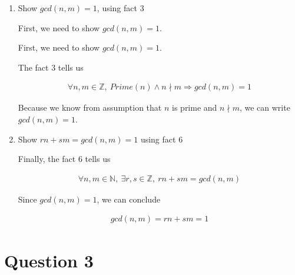 \documentclass[12pt]{article}
\begin{document}
\begin{enumerate}[a.]
\begin{mdframed}
    \bigskip

    \begin{enumerate}[1.]
        \item Show $gcd(n,m) = 1$, using fact 3

        \bigskip

        First, we need to show $gcd(n,m) = 1$.

        \bigskip

        \begin{mdframed}
        First, we need to show $gcd(n,m) = 1$.

        \bigskip

        The fact 3 tells us

        \begin{align}
            \forall n,m \in \mathbb{Z},\:Prime(n) \land n \nmid m \Rightarrow gcd(n,m) = 1
        \end{align}

        \bigskip

        Because we know from assumption that $n$ is prime and $n \nmid m$, we can write
        $gcd(n,m) = 1$.
        \end{mdframed}

        \item Show $rn + sm = gcd(n,m) = 1$ using fact 6

        \bigskip

        \begin{mdframed}
        Finally, the fact 6 tells us

        \begin{align}
            \forall n,m \in \mathbb{N},\:\exists r,s \in \mathbb{Z},\:rn + sm = gcd(n,m)
        \end{align}

        \bigskip

        Since $gcd(n,m) = 1$, we can conclude

        \begin{align}
            gcd(n,m) = rn + sm  = 1
        \end{align}
        \end{mdframed}

    \end{enumerate}

    \end{mdframed}

\end{enumerate}

\section*{Question 3}
\end{document}
